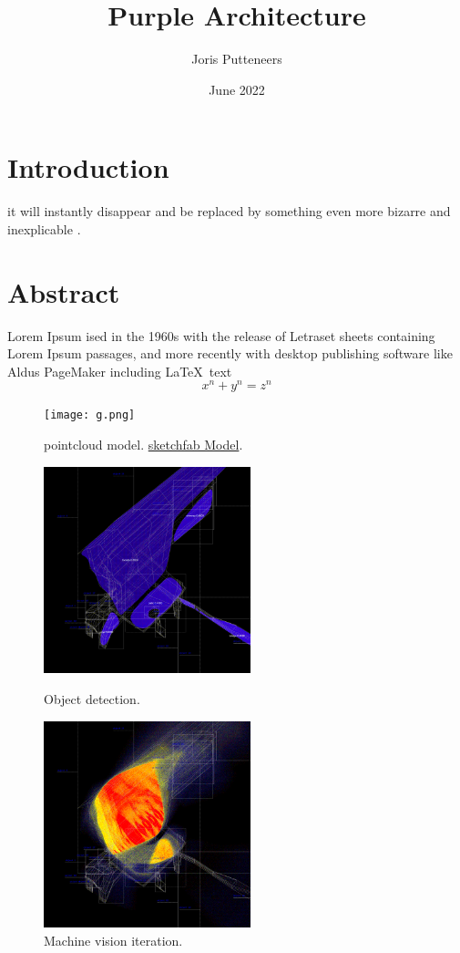 \documentclass{article}
\title{\textbf{Purple Architecture}}
\author{Joris Putteneers}
\date{June 2022}
\begin{document}
\maketitle

\section{Introduction}
it will instantly disappear and be replaced by something even more bizarre and inexplicable \cite{databaseII}.


\section{Abstract}
Lorem Ipsum ised in the 1960s with the release of Letraset sheets containing Lorem Ipsum passages, and more recently with desktop publishing software like Aldus PageMaker including {\color{blue}\LaTeX\ text} \\ \[ x^n + y^n = z^n \]

\begin{figure}[H]
  \centering
  \captionsetup{font=small,justification=raggedright,singlelinecheck=false}
  \texttt{[image: g.png]}
  \caption{pointcloud model. \href{https://sketchfab.com/3d-models/wifi-workspace-visualisation-aefe16a1f9bd4296941e099754eaacc2}{sketchfab Model}.}
  \label{fig:method}
\end{figure}

\begin{figure}[H]
  \captionsetup{font=small,justification=raggedright,singlelinecheck=false}
  \parbox{6cm}{
  \includegraphics[width=6cm]{b.png}
  \caption{Object detection.}
  \label{fig:2figsA}}
  \qquad
  \begin{minipage}{6cm}
  \includegraphics[width=6cm]{a.png}
  \caption{Machine vision iteration.}
  \label{fig:2figsB}
  \end{minipage}
\end{figure}
\end{document}
